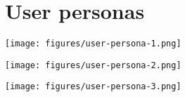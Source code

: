 \chapter{User personas}\label{user_personas}

\begin{center}
\texttt{[image: figures/user-persona-1.png]}
\end{center}

\begin{center}
\texttt{[image: figures/user-persona-2.png]}
\end{center}

\begin{center}
\texttt{[image: figures/user-persona-3.png]}
\end{center}